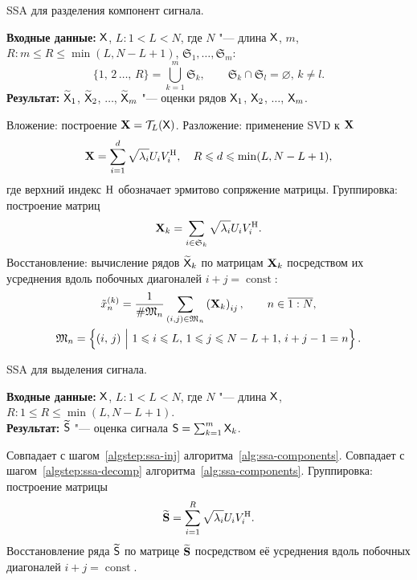 \documentclass[specialist,
  substylefile=spbu_report.rtx,
subf,href,colorlinks=true, 12pt]{disser}
\theoremstyle{plain}
\theoremstyle{definition}
\theoremstyle{remark}
\newcommand{\Input}{\textbf{Входные данные: }}
\newcommand{\Output}{\textbf{Результат: }}
\begin{document}
\begin{algorithm}[!ht]
  \caption{SSA для разделения компонент сигнала.}
  \label{alg:ssa-components}
  \Input $\mathsf{X}$, $L: 1 < L < N$, где $N$ "--- длина $\mathsf{X}$, $m$, $R: m
  \leqslant R\leqslant \min(L, N-L+1)$,
  $\mathfrak{S}_1, \ldots, \mathfrak{S}_m$:
  \[
    \{1,\, 2\,\ldots,\, R\}=\bigcup_{k=1}^{m}\mathfrak{S}_k, \qquad
    \mathfrak{S}_k\cap \mathfrak{S}_l =\varnothing,\,
    k\ne l.
  \]
  \Output $\widetilde{\mathsf{X}}_1$, $\widetilde{\mathsf{X}}_2$, $\ldots$,
  $\widetilde{\mathsf{X}}_m$ "--- оценки рядов
  $\mathsf{X}_1$, $\mathsf{X}_2$, $\ldots$, $\mathsf{X}_m$.
  \begin{algorithmic}[1]
    \State Вложение: построение $\mathbf{X}=\mathcal{T}_L(\mathsf{X})$. \label{algstep:ssa-inj}
    \State Разложение: применение SVD к $\mathbf{X}$ \label{algstep:ssa-decomp}
    \begin{equation*}
      \mathbf{X}=\sum_{i=1}^{d} \sqrt{\lambda_i} U_i V_i^{\mathrm{H}}, \quad R
      \leqslant d \leqslant \min(L, N-L+1),
    \end{equation*}
    где верхний индекс $\mathrm{H}$ обозначает эрмитово сопряжение матрицы.
    \State Группировка: построение матриц
    \begin{equation*}
      \mathbf{X}_k=\sum_{i \in \mathfrak{S}_k} \sqrt{\lambda_i} U_i V_i^{\mathrm{H}}.
    \end{equation*}
    \State Восстановление: вычисление рядов $\widetilde{\mathsf{X}}_k$ по
    матрицам $\mathbf{X}_k$ посредством их усреднения
    вдоль побочных диагоналей $i + j =\operatorname{const}$:
    \begin{gather*}
      \tilde{x}^{(k)}_n=\frac{1}{\#\mathfrak{M}_n}\sum_{(i,j)\in \mathfrak{M}_n}
      \left(\mathbf{X}_k\right)_{ij},\qquad n\in \overline{1:N},\\
      \mathfrak{M}_n=\left\{(i,\, j)~\Big|~1\leqslant i \leqslant
        L,\, 1\leqslant j \leqslant N-L+1,\,
      i+j-1=n\right\}.
    \end{gather*}
  \end{algorithmic}
\end{algorithm}

\begin{algorithm}[!ht]
  \caption{SSA для выделения сигнала.}
  \label{alg:ssa-signal}
  \Input $\mathsf{X}$, $L: 1 < L < N$, где $N$ "--- длина $\mathsf{X}$, $R: 1
  \leqslant R\leqslant \min(L, N-L+1)$.\\
  \Output $\widetilde{\mathsf{S}}$ "--- оценка сигнала $\mathsf{S} = \sum_{k=1}^{m} \mathsf{X}_k$.
  \begin{algorithmic}[1]
    \State Совпадает с шагом~\ref{algstep:ssa-inj}
    алгоритма~\ref{alg:ssa-components}.
    \State Совпадает с шагом~\ref{algstep:ssa-decomp}
    алгоритма~\ref{alg:ssa-components}.
    \State Группировка: построение матрицы
    \begin{equation*}
      \widetilde{\mathbf{S}} = \sum_{i = 1}^{R} \sqrt{\lambda_i} U_i V_i^{\mathrm{H}}.
    \end{equation*}
    \State Восстановление ряда $\widetilde{\mathsf{S}}$ по матрице
    $\widetilde{\mathbf{S}}$ посредством её усреднения
    вдоль побочных диагоналей $i + j =\operatorname{const}$.
  \end{algorithmic}
\end{algorithm}
\end{document}

